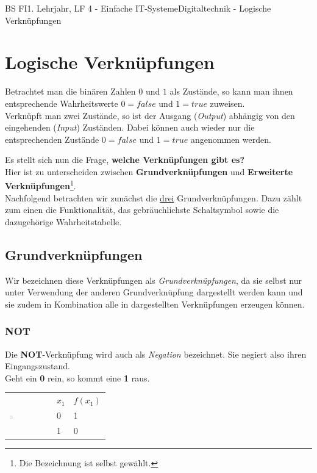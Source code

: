 \documentclass[11pt,twocolumn,oneside,openany,headings=optiontotoc,11pt,numbers=noenddot]{article}
\begin{document}
	\begin{worksheet}{BS FI}{1. Lehrjahr, LF 4 - Einfache IT-Systeme}{Digitaltechnik - Logische Verknüpfungen}
		\setcounter{section}{1}
		\section{Logische Verknüpfungen}
		Betrachtet man die binären Zahlen \(0\) und \(1\) als Zustände, so kann man ihnen entsprechende Wahrheitswerte \(0 = false\) und \(1 = true\) zuweisen.\\
		Verknüpft man zwei Zustände, so ist der Ausgang (\textit{Output}) abhängig von den eingehenden (\textit{Input}) Zuständen. Dabei können auch wieder nur die entsprechenden Zustände \(0 = false\) und \(1 = true\) angenommen werden.\\
		\par\noindent
		Es stellt sich nun die Frage, \textbf{welche Verknüpfungen gibt es?}\\
		Hier ist zu unterscheiden zwischen \textbf{Grundverknüpfungen} und \textbf{Erweiterte Verknüpfungen}\footnote{Die Bezeichnung ist selbst gewählt.}.\\
		Nachfolgend betrachten wir zunächst die \underline{drei} Grundverknüpfungen. Dazu zählt zum einen die Funktionalität, das gebräuchlichste Schaltsymbol sowie die dazugehörige Wahrheitstabelle.
		\subsection{Grundverknüpfungen}
		Wir bezeichnen diese Verknüpfungen als \textit{Grundverknüpfungen}, da sie selbst nur unter Verwendung der anderen Grundverknüpfung dargestellt werden kann und sie zudem in Kombination alle in \textit{} dargestellten Verknüpfungen erzeugen können.
		\subsubsection*{NOT}
		Die \textbf{NOT}-Verknüpfung wird auch als \textit{Negation} bezeichnet. Sie negiert also ihren Eingangszustand.\\
		Geht ein \textbf{0} rein, so kommt eine \textbf{1} raus.
		\par\noindent
		\begin{tabularx}{0.48\textwidth}{ll|l}
			\multirow{3}{*}{\includegraphics[width=0.1\textwidth,align=t]{../99_Bilder/NOT.jpg}} & \(x_1\) & \(f(x_1)\)\\
			\cline{2-3}
			 & 0 & 1\\
			& 1 & 0\\
		\end{tabularx}

\end{worksheet}
\end{document}
